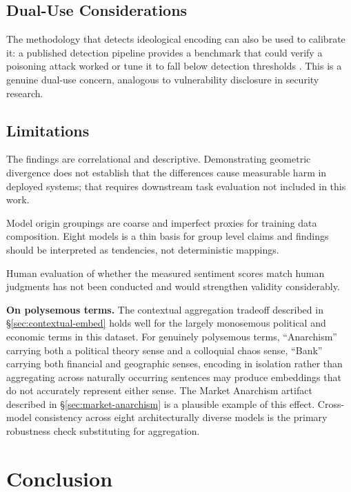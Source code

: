 \documentclass[11pt, letterpaper]{article}
\begin{document}
\subsection{Dual-Use Considerations}

The methodology that detects ideological encoding can also be used to calibrate it: a published detection pipeline provides a benchmark that could verify a poisoning attack worked or tune it to fall below detection thresholds \cite{goodhart1975}. This is a genuine dual-use concern, analogous to vulnerability disclosure in security research.

\subsection{Limitations}

The findings are correlational and descriptive. Demonstrating geometric divergence does not establish that the differences cause measurable harm in deployed systems; that requires downstream task evaluation not included in this work.

Model origin groupings are coarse and imperfect proxies for training data composition. Eight models is a thin basis for group level claims and findings should be interpreted as tendencies, not deterministic mappings.

Human evaluation of whether the measured sentiment scores match human judgments has not been conducted and would strengthen validity considerably.

\textbf{On polysemous terms.} The contextual aggregation tradeoff described in \hyperref[sec:contextual-embed]{§\ref*{sec:contextual-embed}} holds well for the largely monosemous political and economic terms in this dataset. For genuinely polysemous terms, ``Anarchism'' carrying both a political theory sense and a colloquial chaos sense, ``Bank'' carrying both financial and geographic senses, encoding in isolation rather than aggregating across naturally occurring sentences may produce embeddings that do not accurately represent either sense. The Market Anarchism artifact described in \hyperref[sec:market-anarchism]{§\ref*{sec:market-anarchism}} is a plausible example of this effect. Cross-model consistency across eight architecturally diverse models is the primary robustness check substituting for aggregation.

\newpage

\section{Conclusion}
\end{document}
